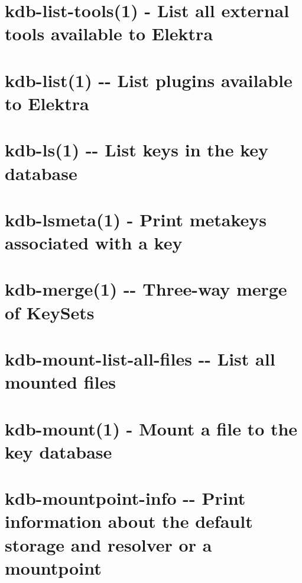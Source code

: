 \documentclass[twoside]{book}
\newcommand{\+}{\discretionary{\mbox{\scriptsize$\hookleftarrow$}}{}{}}
\begin{document}
\chapter{kdb-\/list-\/tools(1) -\/ List all external tools available to Elektra}
\label{md_doc_help_kdb-list-tools}

\chapter{kdb-\/list(1) -\/-\/ List plugins available to Elektra}
\label{md_doc_help_kdb-list}

\chapter{kdb-\/ls(1) -\/-\/ List keys in the key database}
\label{md_doc_help_kdb-ls}

\chapter{kdb-\/lsmeta(1) -\/ Print metakeys associated with a key}
\label{md_doc_help_kdb-lsmeta}

\chapter{kdb-\/merge(1) -\/-\/ Three-\/way merge of Key\+Sets}
\label{md_doc_help_kdb-merge}

\chapter{kdb-\/mount-\/list-\/all-\/files -\/-\/ List all mounted files}
\label{md_doc_help_kdb-mount-list-all-files}

\chapter{kdb-\/mount(1) -\/ Mount a file to the key database}
\label{md_doc_help_kdb-mount}

\chapter{kdb-\/mountpoint-\/info -\/-\/ Print information about the default storage and resolver or a mountpoint}
\label{md_doc_help_kdb-mountpoint-info}

\end{document}
